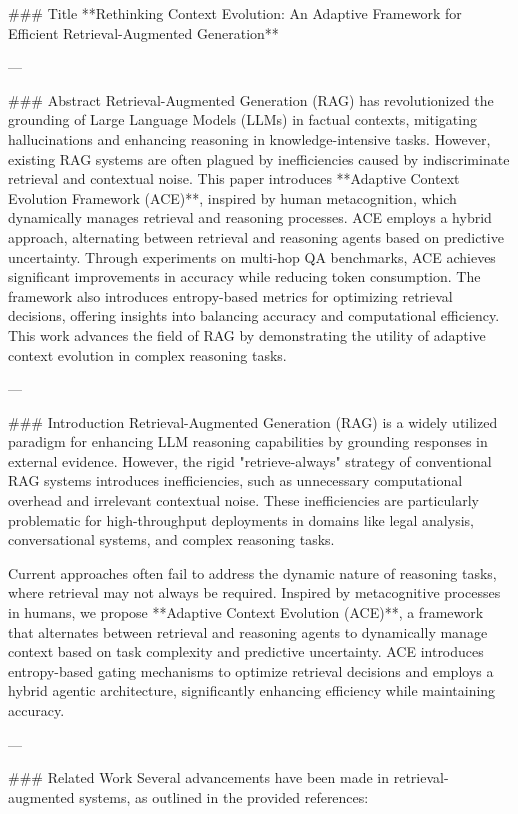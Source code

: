 ### Title  
**Rethinking Context Evolution: An Adaptive Framework for Efficient Retrieval-Augmented Generation**

---

### Abstract  
Retrieval-Augmented Generation (RAG) has revolutionized the grounding of Large Language Models (LLMs) in factual contexts, mitigating hallucinations and enhancing reasoning in knowledge-intensive tasks. However, existing RAG systems are often plagued by inefficiencies caused by indiscriminate retrieval and contextual noise. This paper introduces **Adaptive Context Evolution Framework (ACE)**, inspired by human metacognition, which dynamically manages retrieval and reasoning processes. ACE employs a hybrid approach, alternating between retrieval and reasoning agents based on predictive uncertainty. Through experiments on multi-hop QA benchmarks, ACE achieves significant improvements in accuracy while reducing token consumption. The framework also introduces entropy-based metrics for optimizing retrieval decisions, offering insights into balancing accuracy and computational efficiency. This work advances the field of RAG by demonstrating the utility of adaptive context evolution in complex reasoning tasks.

---

### Introduction  
Retrieval-Augmented Generation (RAG) is a widely utilized paradigm for enhancing LLM reasoning capabilities by grounding responses in external evidence. However, the rigid "retrieve-always" strategy of conventional RAG systems introduces inefficiencies, such as unnecessary computational overhead and irrelevant contextual noise. These inefficiencies are particularly problematic for high-throughput deployments in domains like legal analysis, conversational systems, and complex reasoning tasks.  

Current approaches often fail to address the dynamic nature of reasoning tasks, where retrieval may not always be required. Inspired by metacognitive processes in humans, we propose **Adaptive Context Evolution (ACE)**, a framework that alternates between retrieval and reasoning agents to dynamically manage context based on task complexity and predictive uncertainty. ACE introduces entropy-based gating mechanisms to optimize retrieval decisions and employs a hybrid agentic architecture, significantly enhancing efficiency while maintaining accuracy.

---

### Related Work  
Several advancements have been made in retrieval-augmented systems, as outlined in the provided references:  

